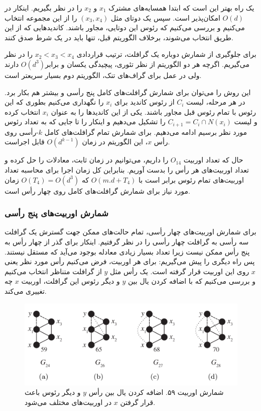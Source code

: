 یک راه بهتر این است که ابتدا همسایه‌های مشترک $x_1$ و $x_2$ را در نظر بگیریم. اینکار در $O(d)$ امکان‌پذیر است. سپس یک دوتای مثل $(x_3,x_4)$ را از این مجموعه انتخاب می‌کنیم و بررسی می‌کنیم که رئوس این دوتایی، مجاور باشند. کاندید‌هایی که از این طریق انتخاب می‌شوند، برخلاف الگوریتم قبل، تنها باید در یک شرط صدق کنند.

برای جلوگیری از شمارش دوباره یک گرافلت، ترتیب قراردادی $x_2 < x_3 < x_4$ را در نظر می‌گیریم. اگرچه هر دو الگوریتم از نظر تئوری، پیچیدگی یکسان و برابر$O(d^3)$ دارند ولی در عمل برای گراف‌های تنک، الگوریتم دوم بسیار سریعتر است.

این روش را می‌توان برای شمارش گرافلت‌های کامل پنج رأسی و بیشتر هم بکار برد. در هر مرحله، لیست $C_i$ از رئوس کاندید برای $x_i$ را نگهداری می‌کنیم بطوری که این رئوس با تمام رئوس قبل مجاور باشند. یکی از این کاندیدها را به عنوان $x_i$ انتخاب کرده و لیست $C_{i+1} = C_i\cap N(x_i)$ را تشکیل می‌دهیم و اینکار را تا جایی که به تعداد رئوس مورد نظر برسیم ادامه می‌دهیم. برای شمارش تمام گرافلت‌های کامل $k$-رأسی روی رأس $x$، این الگوریتم در زمان $O(d^{k-1})$ قابل اجراست.

حال که تعداد اوربیت $O_{14}$ را داریم، می‌توانیم در زمان ثابت، معادلات را حل کرده و تعداد اوربیت‌های هر رأس را بدست آوریم. بنابراین کل زمان اجرا برای محاسبه تعداد اوربیت‌های تمام رئوس برابر است با $O(m.d+T_4)$ که $O(T_4) = O(d^3)$ زمان مورد نیاز برای شمارش گرافلت‌های کامل روی چهار رأس است.

\subsubsection{شمارش اوربیت‌های پنج رأسی}
برای شمارش اوربیت‌های چهار رأسی، تمام حالت‌های ممکن جهت گسترش یک گرافلت سه رأسی به گرافلت چهار رأسی را در نظر گرفتیم. اینکار برای گذر از چهار رأس به پنج رأس ممکن نیست زیرا تعداد بسیار زیادی معادله بوجود می‌آید که مستقل نیستند. پس راه دیگری را پیش می‌گیریم: برای هر اوربیت، فرض می‌کنیم رأس مورد نظر یعنی $x$ روی این اوربیت قرار گرفته است. یک رأس مثل $y$ از گرافلت متناظر انتخاب می‌کنیم و بررسی می‌کنیم که با اضافه کردن یال بین $y$ و دیگر رئوس این گرافلت، اوربیت $x$ چه تغییری می‌کند.

\begin{figure}[t]
\centering
\includegraphics[scale=0.3]{./o59-orbit-relation.png}
\caption{شمارش اوربیت ۵۹. اضافه کردن یال بین رأس $y$ و دیگر رئوس باعث قرار گرفتن $x$ در اوربیت‌های مختلف می‌شود.}
\label{fig:o59-orbit-relation}
\end{figure}

